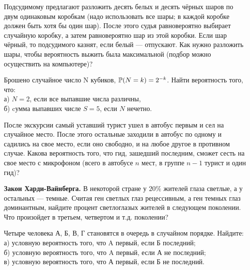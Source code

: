 \begin{problem}
    Подсудимому предлагают разложить десять белых и десять чёрных шаров по двум одинаковым коробкам (надо использовать все шары; в каждой коробке должен быть хотя бы один шар).
    После этого судья равновероятно выбирает случайную коробку, а затем равновероятно шар из этой коробки.
    Если шар чёрный, то подсудимого казнят, если белый — отпускают.
    Как нужно разложить шары, чтобы вероятность выжить была максимальной (подбор можно осуществить на компьютере)?
\end{problem}

\begin{problem}
    Брошено случайное число N кубиков, $\operatorname{\mathbb{P}}(N = k) = 2^{-k}$.
    Найти вероятность того, что:\\
    а) $N = 2$, если все выпавшие числа различны,\\
    б) cумма выпавших числе $S = 5$, если $N$ нечетно.
\end{problem}

\begin{problem}
    После экскурсии самый уставший турист ушел в автобус первым и сел на случайное место.
    После этого остальные заходили в автобус по одному и садились на свое место, если оно свободно, и на любое
другое в противном случае.
    Какова вероятность того, что гид, зашедший последним, сможет сесть на свое место с микрофоном (всего в автобусе $n$ мест, в группе $n - 1$ турист и один гид)?
\end{problem}

\begin{problem}
    \textbf{Закон Харди-Вайнберга.}
    В некоторой стране у $20\%$ жителей глаза светлые, а у остальных — темные.
    Считая ген светлых глаз рецессивным, а ген темных глаз доминантным, найдите процент светлоглазых жителей в следующем поколении.
    Что произойдет в третьем, четвертом и т.д. поколении?
\end{problem}

\begin{problem}
    Четыре человека А, Б, В, Г становятся в очередь в случайном порядке.
    Найдите:\\
    а) условную вероятность того, что A первый, если Б последний;\\
    б) условную вероятность того, что A первый, если А не последний;\\
    в) условную вероятность того, что А первый, если Б не последний.
\end{problem}

